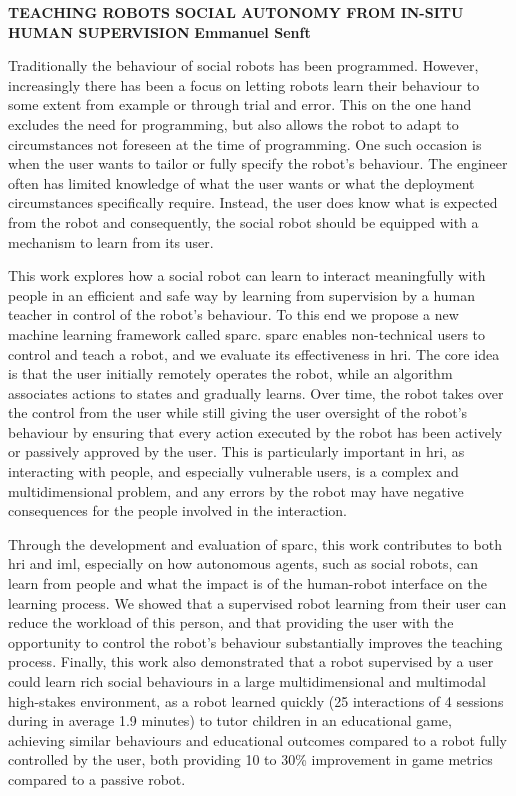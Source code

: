 \textbf{TEACHING ROBOTS SOCIAL AUTONOMY FROM IN-SITU HUMAN SUPERVISION}\newline
\textbf{Emmanuel Senft}

Traditionally the behaviour of social robots has been programmed. However, increasingly there has been a focus on letting robots learn their behaviour to some extent from example or through trial and error. This on the one hand excludes the need for programming, but also allows the robot to adapt to circumstances not foreseen at the time of programming. One such occasion is when the user wants to tailor or fully specify the robot’s behaviour. The engineer often has limited knowledge of what the user wants or what the deployment circumstances specifically require. Instead, the user does know what is expected from the robot and consequently, the social robot should be equipped with a mechanism to learn from its user.

This work explores how a social robot can learn to interact meaningfully with people in an efficient and safe way by learning from supervision by a human teacher in control of the robot's behaviour. To this end we propose a new machine learning framework called \gls{sparc}. \gls{sparc} enables non-technical users to control and teach a robot, and we evaluate its effectiveness in \gls{hri}. The core idea is that the user initially remotely operates the robot, while an algorithm associates actions to states and gradually learns. Over time, the robot takes over the control from the user while still giving the user oversight of the robot’s behaviour by ensuring that every action executed by the robot has been actively or passively approved by the user. This is particularly important in \gls{hri}, as interacting with people, and especially vulnerable users, is a complex and multidimensional problem, and any errors by the robot may have negative consequences for the people involved in the interaction. 

Through the development and evaluation of \gls{sparc}, this work contributes to both \gls{hri} and \acrlong{iml}, especially on how autonomous agents, such as social robots, can learn from people and what the impact is of the human-robot interface on the learning process. We showed that a supervised robot learning from their user can reduce the workload of this person, and that providing the user with the opportunity to control the robot's behaviour substantially improves the teaching process. Finally, this work also demonstrated that a robot supervised by a user could learn rich social behaviours in a large multidimensional and multimodal high-stakes environment, as a robot learned quickly (25 interactions of 4 sessions during in average 1.9 minutes) to tutor children in an educational game, achieving similar behaviours and educational outcomes compared to a robot fully controlled by the user, both providing 10 to 30\% improvement in game metrics compared to a passive robot. 